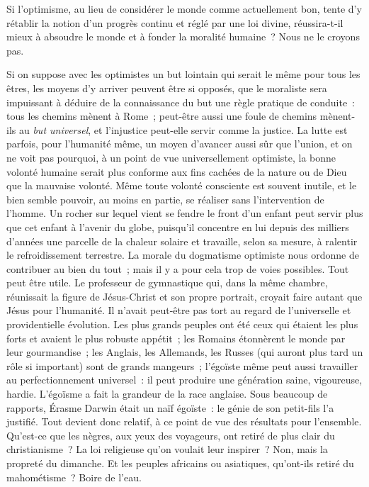 \documentclass[french,twoside]{book} %
\begin{document}
Si l’optimisme, au lieu de considérer le monde comme actuellement bon, tente d’y rétablir la notion d’un progrès continu et réglé par une loi divine, réussira-t-il mieux à absoudre le monde et à fonder la moralité humaine ? Nous ne le croyons pas.\par
Si on suppose avec les optimistes un but lointain qui serait le même pour tous les êtres, les moyens d’y arriver peuvent être si opposés, que le moraliste sera impuissant à déduire de la connaissance du but une règle pratique de conduite : tous les chemins mènent à Rome ; peut-être aussi une foule de chemins mènent-ils au \emph{but universel}, et l’injustice peut-elle servir comme la justice. La lutte est parfois, pour l’humanité même, un moyen d’avancer aussi sûr que l’union, et on ne voit pas pourquoi, à un point de vue universellement optimiste, la bonne volonté humaine serait plus conforme aux fins cachées de la nature ou de Dieu que la mauvaise volonté. Même toute volonté consciente est souvent inutile, et le bien semble pouvoir, au moins en partie, se réaliser sans l’intervention de l’homme. Un rocher sur lequel vient se fendre le front d’un enfant peut servir plus que cet enfant à l’avenir du globe, puisqu’il concentre en lui depuis des milliers d’années une parcelle de la chaleur solaire et travaille, selon sa mesure, à ralentir le refroidissement terrestre. La morale du dogmatisme optimiste nous ordonne de contribuer au bien du tout ; mais il y a pour cela trop de voies possibles. Tout peut être utile. Le professeur de gymnastique qui, dans la même chambre, réunissait la figure de Jésus-Christ et son propre portrait, croyait faire autant que Jésus pour l’humanité. Il n’avait peut-être pas tort au regard de l’universelle et providentielle évolution. Les plus grands peuples ont été ceux qui étaient les plus forts et avaient le plus robuste appétit ; les Romains étonnèrent le monde par leur gourmandise ; les Anglais, les Allemands, les Russes (qui auront plus tard un rôle si important) sont de grands mangeurs ; l’égoïste même peut aussi travailler au perfectionnement universel : il peut produire une génération saine, vigoureuse, hardie. L’égoïsme a fait la grandeur de la race anglaise. Sous beaucoup de rapports, Érasme Darwin était un naïf égoïste : le génie de son petit-fils l’a justifié. Tout devient donc relatif, à ce point de vue des résultats pour l’ensemble. Qu’est-ce que les nègres, aux yeux des voyageurs, ont retiré de plus clair du christianisme ? La loi religieuse qu’on voulait leur inspirer ? Non, mais la propreté du dimanche. Et les peuples africains ou asiatiques, qu’ont-ils retiré du mahométisme ? Boire de l’eau.\par
\end{document}
